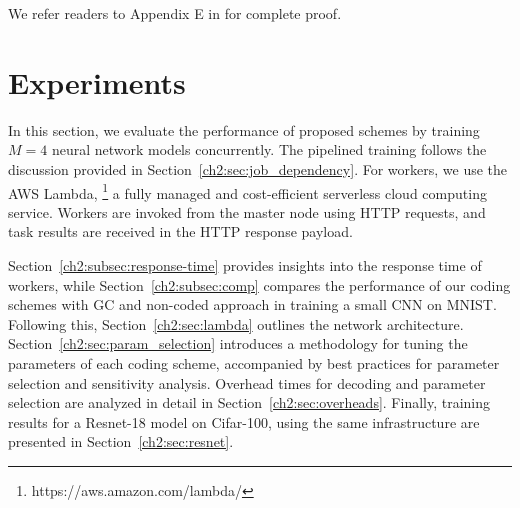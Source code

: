 We refer readers to Appendix E in \cite{krishnan2023sequential} for complete proof.

 







\section{Experiments} \label{ch2:sec:experiments}

In this section, we evaluate the performance of proposed schemes by training $M=4$ neural network models concurrently. The pipelined training follows the discussion provided in Section~\ref{ch2:sec:job_dependency}.
For workers, we use the AWS Lambda, \footnote{https://aws.amazon.com/lambda/}
a fully managed and cost-efficient serverless cloud computing service. Workers are invoked from the master node using HTTP requests, and task results are received in the HTTP response payload. 

Section~\ref{ch2:subsec:response-time} provides insights into the response time of workers, while Section~\ref{ch2:subsec:comp} compares the performance of our coding schemes with GC and non-coded approach in training a small CNN on MNIST. Following this, Section~\ref{ch2:sec:lambda} outlines the network architecture. Section~\ref{ch2:sec:param_selection} introduces a methodology for tuning the parameters of each coding scheme, accompanied by best practices for parameter selection and sensitivity analysis. Overhead times for decoding and parameter selection are analyzed in detail in Section~\ref{ch2:sec:overheads}. Finally, training results for a Resnet-18 model on Cifar-100, using the same infrastructure are presented in Section~\ref{ch2:sec:resnet}.

